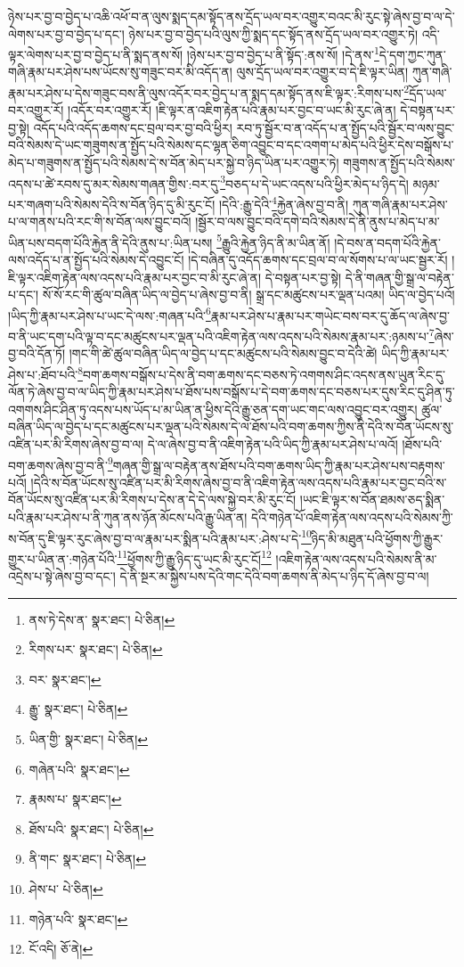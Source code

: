 ཉེས་པར་བྱ་བ་བྱེད་པ་འཆི་འཕོ་བ་ན་ལུས་སྨད་དམ་སྟོད་ནས་དྲོད་ཡལ་བར་འགྱུར་བའང་མི་རུང་སྟེ་ཞེས་བྱ་བ་ལ་དེ་ལེགས་པར་བྱ་བ་བྱེད་པ་དང་། ཉེས་པར་བྱ་བ་བྱེད་པའི་ལུས་ཀྱི་སྨད་དང་སྟོད་ནས་དྲོད་ཡལ་བར་འགྱུར་ཏེ། འདི་ལྟར་ལེགས་པར་བྱ་བ་བྱེད་པ་ནི་སྨད་ནས་སོ། །ཉེས་པར་བྱ་བ་བྱེད་པ་ནི་སྟོད་:ནས་སོ། །དེ་ནས་\footnote{ནས་ཏེ་དེས་ན་  སྣར་ཐང་།  པེ་ཅིན། }དེ་དག་ཀྱང་ཀུན་གཞི་རྣམ་པར་ཤེས་པས་ཡོངས་སུ་གཟུང་བར་མི་འདོད་ན། ལུས་དྲོད་ཡལ་བར་འགྱུར་བ་དེ་ཇི་ལྟར་ཡིན། ཀུན་གཞི་རྣམ་པར་ཤེས་པ་དེས་གཟུང་བས་ནི་ལུས་འདོར་བར་བྱེད་པ་ན་སྨད་དམ་སྟོད་ནས་ཇི་ལྟར་:རིགས་པས་\footnote{རིགས་པར་  སྣར་ཐང་།  པེ་ཅིན། }དྲོད་ཡལ་བར་འགྱུར་རོ། །འདོར་བར་འགྱུར་རོ། །ཇི་ལྟར་ན་འཇིག་རྟེན་པའི་རྣམ་པར་བྱང་བ་ཡང་མི་རུང་ཞེ་ན། དེ་བསྟན་པར་བྱ་སྟེ། འདོད་པའི་འདོད་ཆགས་དང་བྲལ་བར་བྱ་བའི་ཕྱིར། རབ་ཏུ་སྦྱོར་བ་ན་འདོད་པ་ན་སྤྱོད་པའི་སྦྱོར་བ་ལས་བྱུང་བའི་སེམས་དེ་ཡང་གཟུགས་ན་སྤྱོད་པའི་སེམས་དང་ལྷན་ཅིག་འབྱུང་བ་དང་འགག་པ་མེད་པའི་ཕྱིར་དེས་བསྒོས་པ་མེད་པ་གཟུགས་ན་སྤྱོད་པའི་སེམས་དེ་ས་བོན་མེད་པར་སྐྱེ་བ་ཉིད་ཡིན་པར་འགྱུར་ཏེ། གཟུགས་ན་སྤྱོད་པའི་སེམས་འདས་པ་ཚེ་རབས་དུ་མར་སེམས་གཞན་གྱིས་:བར་དུ་\footnote{བར་  སྣར་ཐང་། }བཅད་པ་དེ་ཡང་འདས་པའི་ཕྱིར་མེད་པ་ཉིད་དེ། མཉམ་པར་གཞག་པའི་སེམས་དེའི་ས་བོན་ཉིད་དུ་མི་རུང་ངོ། །དེའི་:རྒྱུ་དེའི་\footnote{རྒྱུ་  སྣར་ཐང་།  པེ་ཅིན། }རྐྱེན་ཞེས་བྱ་བ་ནི། ཀུན་གཞི་རྣམ་པར་ཤེས་པ་ལ་གནས་པའི་རང་གི་ས་བོན་ལས་བྱུང་བའོ། །སྦྱོར་བ་ལས་བྱུང་བའི་དགེ་བའི་སེམས་དེ་ནི་ནུས་པ་མེད་པ་མ་ཡིན་པས་བདག་པོའི་རྐྱེན་ནི་དེའི་ནུས་པ་:ཡིན་པས། \footnote{ཡིན་གྱི་  སྣར་ཐང་།  པེ་ཅིན། }རྒྱུའི་རྐྱེན་ཉིད་ནི་མ་ཡིན་ནོ། །དེ་བས་ན་བདག་པོའི་རྐྱེན་ལས་འདོད་པ་ན་སྤྱོད་པའི་སེམས་དེ་འབྱུང་ངོ། །དེ་བཞིན་དུ་འདོད་ཆགས་དང་བྲལ་བ་ལ་སོགས་པ་ལ་ཡང་སྦྱར་རོ། །ཇི་ལྟར་འཇིག་རྟེན་ལས་འདས་པའི་རྣམ་པར་བྱང་བ་མི་རུང་ཞེ་ན། དེ་བསྟན་པར་བྱ་སྟེ། དེ་ནི་གཞན་གྱི་སྒྲ་ལ་བརྟེན་པ་དང་། སོ་སོ་རང་གི་ཚུལ་བཞིན་ཡིད་ལ་བྱེད་པ་ཞེས་བྱ་བ་ནི། སྒྲ་དང་མཚུངས་པར་ལྡན་པའམ། ཡིད་ལ་བྱེད་པའོ། །ཡིད་ཀྱི་རྣམ་པར་ཤེས་པ་ཡང་དེ་ལས་:གཞན་པའི་\footnote{གཞེན་པའི་  སྣར་ཐང་། }རྣམ་པར་ཤེས་པ་རྣམ་པར་གཡེང་བས་བར་དུ་ཆོད་ལ་ཞེས་བྱ་བ་ནི་ཡང་དག་པའི་ལྟ་བ་དང་མཚུངས་པར་ལྡན་པའི་འཇིག་རྟེན་ལས་འདས་པའི་སེམས་རྣམ་པར་:ཉམས་པ་\footnote{རྣམས་པ་  སྣར་ཐང་། }ཞེས་བྱ་བའི་དོན་ཏོ། །གང་གི་ཚེ་ཚུལ་བཞིན་ཡིད་ལ་བྱེད་པ་དང་མཚུངས་པའི་སེམས་བྱུང་བ་དེའི་ཚེ། ཡིད་ཀྱི་རྣམ་པར་ཤེས་པ་:ཐོབ་པའི་\footnote{ཐོས་པའི་  སྣར་ཐང་།  པེ་ཅིན། }བག་ཆགས་བསྒོས་པ་དེས་ནི་བག་ཆགས་དང་བཅས་ཏེ་འགགས་ཤིང་འདས་ནས་ཡུན་རིང་དུ་ལོན་ཏེ་ཞེས་བྱ་བ་ལ་ཡིད་ཀྱི་རྣམ་པར་ཤེས་པ་ཐོས་པས་བསྒོས་པ་དེ་བག་ཆགས་དང་བཅས་པར་དུས་རིང་དུ་ཤིན་ཏུ་འགགས་ཤིང་ཤིན་ཏུ་འདས་པས་ཡོད་པ་མ་ཡིན་ན་ཕྱིས་དེའི་རྒྱུ་ཅན་དག་ཡང་གང་ལས་འབྱུང་བར་འགྱུར། ཚུལ་བཞིན་ཡིད་ལ་བྱེད་པ་དང་མཚུངས་པར་ལྡན་པའི་སེམས་དེ་ལ་ཐོས་པའི་བག་ཆགས་ཀྱིས་ནི་དེའི་ས་བོན་ཡོངས་སུ་འཛིན་པར་མི་རིགས་ཞེས་བྱ་བ་ལ། དེ་ལ་ཞེས་བྱ་བ་ནི་འཇིག་རྟེན་པའི་ཡིད་ཀྱི་རྣམ་པར་ཤེས་པ་ལའོ། །ཐོས་པའི་བག་ཆགས་ཞེས་བྱ་བ་ནི་\footnote{ནི་གང་  སྣར་ཐང་།  པེ་ཅིན། }གཞན་གྱི་སྒྲ་ལ་བརྟེན་ནས་ཐོས་པའི་བག་ཆགས་ཡིད་ཀྱི་རྣམ་པར་ཤེས་པས་བརྟགས་པའོ། །དེའི་ས་བོན་ཡོངས་སུ་འཛིན་པར་མི་རིགས་ཞེས་བྱ་བ་ནི་འཇིག་རྟེན་ལས་འདས་པའི་རྣམ་པར་བྱང་བའི་ས་བོན་ཡོངས་སུ་འཛིན་པར་མི་རིགས་པ་དེས་ན་དེ་དེ་ལས་སྐྱེ་བར་མི་རུང་ངོ། །ཡང་ཇི་ལྟར་ས་བོན་ཐམས་ཅད་སྨིན་པའི་རྣམ་པར་ཤེས་པ་ནི་ཀུན་ནས་ཉོན་མོངས་པའི་རྒྱུ་ཡིན་ན། དེའི་གཉེན་པོ་འཇིག་རྟེན་ལས་འདས་པའི་སེམས་ཀྱི་ས་བོན་དུ་ཇི་ལྟར་རུང་ཞེས་བྱ་བ་ལ་རྣམ་པར་སྨིན་པའི་རྣམ་པར་:ཤེས་པ་དེ་\footnote{ཤེས་པ་  པེ་ཅིན། }ཉིད་མི་མཐུན་པའི་ཕྱོགས་ཀྱི་རྒྱུར་གྱུར་པ་ཡིན་ན་:གཉེན་པོའི་\footnote{གཉེན་པའི་  སྣར་ཐང་། }ཕྱོགས་ཀྱི་རྒྱུ་ཉིད་དུ་ཡང་མི་རུང་ངོ།\footnote{ངོ་འདི།  ཅོ་ནེ། } །འཇིག་རྟེན་ལས་འདས་པའི་སེམས་ནི་མ་འདྲེས་པ་སྟེ་ཞེས་བྱ་བ་དང་། དེ་ནི་སྔར་མ་སྐྱེས་པས་དེའི་གང་དེའི་བག་ཆགས་ནི་མེད་པ་ཉིད་དོ་ཞེས་བྱ་བ་ལ། 